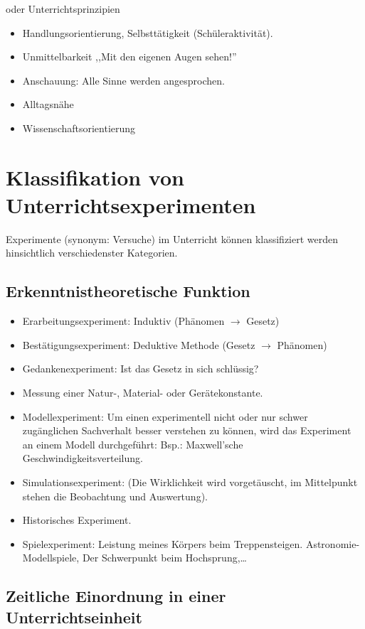 oder Unterrichtsprinzipien

\begin{itemize}
	\item
	Handlungsorientierung, Selbstt\"{a}tigkeit (Sch\"{u}leraktivit\"{a}t).
	\item
	Unmittelbarkeit ,,Mit den eigenen Augen sehen!''
	\item
	Anschauung: Alle Sinne werden angesprochen.
	\item
	Alltagsn\"{a}he
	\item
	Wissenschaftsorientierung
\end{itemize}

\bip\bip
\section{Klassifikation von Unterrichtsexperimenten}
Experimente (synonym: Versuche) im Unterricht k\"{o}nnen
klassifiziert werden hinsichtlich verschiedenster Kategorien.

\subsection{Erkenntnistheoretische Funktion}
\begin{itemize}
	\item
	Erarbeitungsexperiment: Induktiv (Ph\"{a}nomen $\to$ Gesetz)
	\item
	Best\"{a}tigungsexperiment: Deduktive Methode (Gesetz $\to$ Ph\"{a}nomen)
	\item
	Gedankenexperiment: Ist das Gesetz in sich schl\"{u}ssig?
	\item
	Messung einer Natur-, Material- oder Ger\"{a}tekonstante.
	\item
	Modellexperiment: Um einen experimentell nicht oder nur schwer
	zug\"{a}nglichen Sachverhalt besser verstehen zu k\"{o}nnen,
	wird das Experiment an einem Modell durchgef\"{u}hrt:
	Bsp.: Maxwell'sche Geschwindigkeitsverteilung.
	\item
	Simulationsexperiment: (Die Wirklichkeit wird vorget\"{a}uscht,
	im Mittelpunkt stehen die Beobachtung und Auswertung).
	\item
	Historisches Experiment.
	\item
	Spielexperiment: Leistung meines K\"{o}rpers beim Treppensteigen.
	Astronomie-Modellspiele, Der Schwerpunkt beim Hochsprung,\dots
\end{itemize}

\subsection{Zeitliche Einordnung in einer Unterrichtseinheit}

